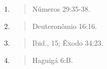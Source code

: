 \begin{enumerate}
\def\labelenumi{\arabic{enumi}.}
\setcounter{enumi}{66}
\item
 \begin{quote}
 Números 29:35-38.
 \end{quote}
\item
 \begin{quote}
 Deuteronômio 16:16.
 \end{quote}
\item
 \begin{quote}
 Ibid., 15; Êxodo 34:23.
 \end{quote}
\item
 \begin{quote}
 Haguigá 6:B.
 \end{quote}
\end{enumerate}

